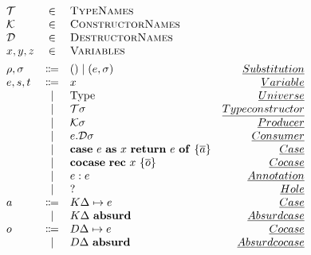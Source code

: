 \[
\begin{array}{lclr}
    \mathcal{T} &\in &\textsc{TypeNames} & \\
    \mathcal{K} &\in &\textsc{ConstructorNames} & \\
    \mathcal{D} &\in &\textsc{DestructorNames} & \\
    x,y,z &\in &\textsc{Variables} & \\[0.15cm]
    \rho, \sigma &\Coloneqq & () \mid (e,\sigma) & \emph{Substitution} \\
    e,s,t &\Coloneqq & x & \emph{Variable} \\
    & \mid & \text{Type} & \emph{Universe} \\
    & \mid & \mathcal{T}\sigma & \emph{Type constructor} \\
    & \mid & \mathcal{K}\sigma & \emph{Producer} \\
    & \mid & e.\mathcal{D}\sigma & \emph{Consumer} \\
    & \mid & \mathbf{case}\ e\ \mathbf{as}\ x\ \mathbf{return}\ e\  \mathbf{of}\ \{ \overline{a} \} & \emph{Case} \\
    & \mid & \mathbf{cocase}\ \mathbf{rec}\ x\ \{ \overline{o} \} & \emph{Cocase} \\
    & \mid & e : e & \emph{Annotation} \\
    & \mid & ? & \emph{Hole} \\
    a & \Coloneqq & K\Delta \mapsto e &\emph{Case} \\
    & \mid & K\Delta\ \mathbf{absurd} &\emph{Absurd case} \\
    o & \Coloneqq & D\Delta \mapsto e &\emph{Cocase} \\
    & \mid & D\Delta\ \mathbf{absurd} & \emph{Absurd cocase} \\
\end{array}
\]